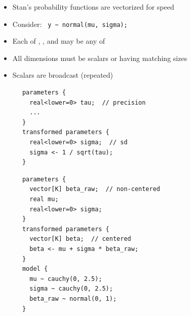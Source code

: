 \documentclass[10pt]{report}
\begin{document}
\begin{itemize}
\item Stan's probability functions are vectorized for speed
\item Consider: \ \Verb|y ~ normal(mu, sigma);|
\item Each of , , and  may be any of
\item All dimensions must be scalars or having matching sizes
\item Scalars are broadcast (repeated)
\end{itemize}


{\small
\begin{Verbatim}
      parameters {
        real<lower=0> tau;  // precision
        ...
      }
      transformed parameters {
        real<lower=0> sigma;  // sd
        sigma <- 1 / sqrt(tau);
      }
\end{Verbatim}
}

{\small
\begin{Verbatim}
      parameters {
        vector[K] beta_raw;  // non-centered
        real mu;
        real<lower=0> sigma;
      }
      transformed parameters {
        vector[K] beta;  // centered
        beta <- mu + sigma * beta_raw;
      }
      model {
        mu ~ cauchy(0, 2.5);
        sigma ~ cauchy(0, 2.5);
        beta_raw ~ normal(0, 1);
      }
\end{Verbatim}
}


\end{document}
